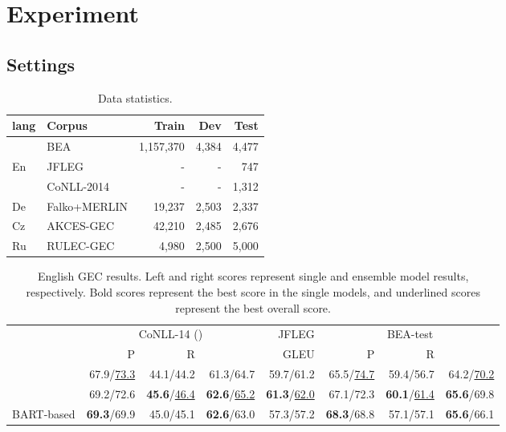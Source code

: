 \documentclass[11pt,a4paper]{article}
\begin{document}
\section{Experiment}
\subsection{Settings}

\begin{table}[t]
    \centering
    \small
    \begin{tabular}{llrrr} \toprule
        lang & Corpus & Train & Dev & Test \\ \midrule \midrule
                 & BEA & 1,157,370 & 4,384 & 4,477 \\
        En       & JFLEG & - & - & 747 \\
           & CoNLL-2014 & - & - & 1,312 \\ \midrule
        De & Falko+MERLIN & 19,237 & 2,503 & 2,337 \\ \midrule
        Cz & AKCES-GEC & 42,210 & 2,485 & 2,676 \\ \midrule
        Ru & RULEC-GEC & 4,980 & 2,500 & 5,000 \\ \bottomrule
    \end{tabular}
    \caption{Data statistics.}
    \label{gec-data}
\end{table}

\begin{table*}[t]
  \centering
  \small
  \begin{tabular}{lrrrrrrr} \toprule
      &  \multicolumn{3}{c}{CoNLL-14 ()} & JFLEG & \multicolumn{3}{c}{BEA-test} \\ \cmidrule(lr){2-4} \cmidrule(lr){5-5} \cmidrule(lr){6-8}
      & P & R &  & GLEU &  P & R &    \\ \midrule
      \citet{kiyono2019} & 67.9/\underline{73.3} & 44.1/44.2 & 61.3/64.7 & 59.7/61.2 & 65.5/\underline{74.7} & 59.4/56.7 & 64.2/\underline{70.2} \\
      \citet{kaneko_bert} & 69.2/72.6 & \textbf{45.6}/\underline{46.4} & \textbf{62.6}/\underline{65.2} & \textbf{61.3}/\underline{62.0} & 67.1/72.3 & \textbf{60.1}/\underline{61.4} & \textbf{65.6}/69.8 \\
      BART-based & \textbf{69.3}/69.9 & 45.0/45.1 & \textbf{62.6}/63.0 & 57.3/57.2 & \textbf{68.3}/68.8 & 57.1/57.1 & \textbf{65.6}/66.1 \\
      \bottomrule
  \end{tabular}
  \caption{English GEC results. Left and right scores represent single and ensemble model results, respectively. Bold scores represent the best score in the single models, and underlined scores represent the best overall score.}
  \label{result_score_english}
\end{table*}
\end{document}
